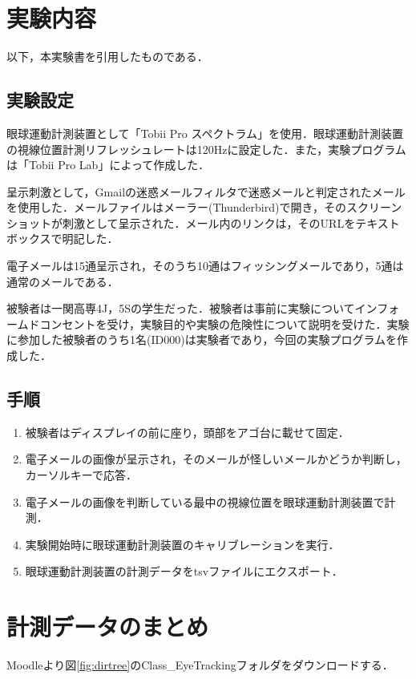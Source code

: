 \documentclass[a4paper,11pt]{ltjsreport}
\begin{document}
\section{実験内容}
以下，本実験書\cite{jikkensho}を引用したものである．

\subsection{実験設定}
眼球運動計測装置として「Tobii Pro スペクトラム」を使用．眼球運動計測装置の視線位置計測リフレッシュレートは120\si{\hertz}に設定した．また，実験プログラムは「Tobii Pro Lab」によって作成した．

呈示刺激として，Gmailの迷惑メールフィルタで迷惑メールと判定されたメールを使用した．メールファイルはメーラー(Thunderbird)で開き，そのスクリーンショットが刺激として呈示された．メール内のリンクは，そのURLをテキストボックスで明記した．

電子メールは15通呈示され，そのうち10通はフィッシングメールであり，5通は通常のメールである．

被験者は一関高専4J，5Sの学生だった．被験者は事前に実験についてインフォームドコンセントを受け，実験目的や実験の危険性について説明を受けた．実験に参加した被験者のうち1名(ID000)は実験者であり，今回の実験プログラムを作成した．

\subsection{手順}
\begin{enumerate}
	\item 被験者はディスプレイの前に座り，頭部をアゴ台に載せて固定．
	\item 電子メールの画像が呈示され，そのメールが怪しいメールかどうか判断し，カーソルキーで応答．
	\item 電子メールの画像を判断している最中の視線位置を眼球運動計測装置で計測．
	\item 実験開始時に眼球運動計測装置のキャリブレーションを実行．
	\item 眼球運動計測装置の計測データをtsvファイルにエクスポート．
\end{enumerate}
\clearpage
\section{計測データのまとめ}
Moodleより図\ref{fig:dirtree}のClass\_EyeTrackingフォルダをダウンロードする．
\end{document}
